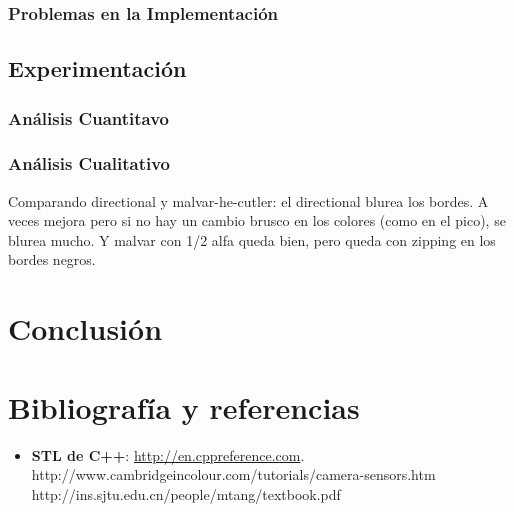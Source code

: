 \subsubsection{Problemas en la Implementación}

	
\subsection{Experimentación}


\subsubsection{Análisis Cuantitavo}

\subsubsection{Análisis Cualitativo}

Comparando directional y malvar-he-cutler: el directional blurea los bordes. A veces mejora pero si no hay un cambio brusco en los colores (como en el pico), se blurea mucho. Y malvar con 1/2 alfa queda bien, pero queda con zipping en los bordes negros.


\section{Conclusión}


\section{Bibliografía y referencias} %

\begin{itemize}
	\item \textbf{STL de C++}: \url{http://en.cppreference.com}.
http://www.cambridgeincolour.com/tutorials/camera-sensors.htm
http://ins.sjtu.edu.cn/people/mtang/textbook.pdf
\end{itemize}



